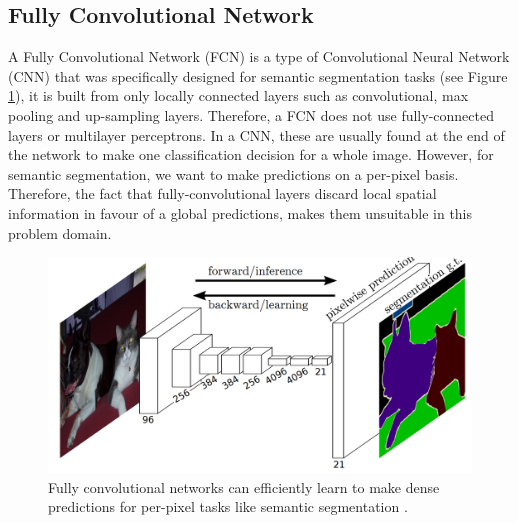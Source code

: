 \documentclass{article}
\begin{document}

\subsection{Fully Convolutional Network}

A Fully Convolutional Network (FCN) \cite{Long2015FullyCN} is a type of Convolutional Neural Network (CNN) that was specifically designed for semantic segmentation tasks (see Figure \ref{fig:fcn}), it is built from only locally connected layers such as convolutional, max pooling and up-sampling layers. Therefore, a FCN does not use fully-connected layers or multilayer perceptrons. In a CNN, these are usually found at the end of the network to make one classification decision for a whole image. However, for semantic segmentation, we want to make predictions on a per-pixel basis. Therefore, the fact that fully-convolutional layers discard local spatial information in favour of a global predictions, makes them unsuitable in this problem domain.

\begin{figure}[htbp]
\vskip 5mm
\begin{center}
\centerline{\includegraphics[scale=0.15]{mlp-cw3-template/Figures/fcn.png}}
\caption{Fully convolutional networks can efficiently learn to make dense predictions for per-pixel tasks like semantic segmentation \cite{Long2015FullyCN}.}
\label{fig:fcn}
\end{center}
\vskip -5mm
\end{figure} 
\end{document}
